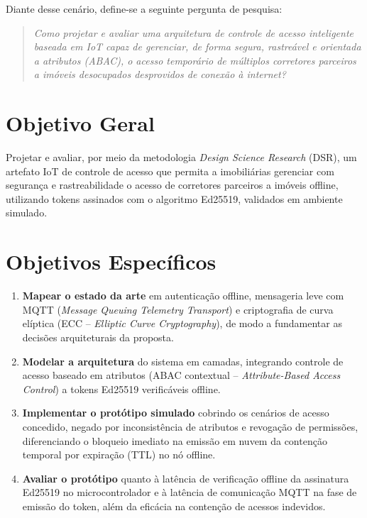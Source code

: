 Diante desse cenário, define-se a seguinte pergunta de pesquisa:

\begin{quote}
\textit{Como projetar e avaliar uma arquitetura de controle de acesso inteligente baseada em IoT capaz de gerenciar, de forma segura, rastreável e orientada a atributos (ABAC), o acesso temporário de múltiplos corretores parceiros a imóveis desocupados desprovidos de conexão à internet?}
\end{quote}

\section{Objetivo Geral}
\label{sec:objetivo-geral}

Projetar e avaliar, por meio da metodologia \textit{Design Science Research} (DSR), um artefato IoT de controle de acesso que permita a imobiliárias gerenciar com segurança e rastreabilidade o acesso de corretores parceiros a imóveis offline, utilizando tokens assinados com o algoritmo Ed25519, validados em ambiente simulado.

\section{Objetivos Específicos}
\label{sec:objetivos-especificos}

\begin{enumerate}
    \item \textbf{Mapear o estado da arte} em autenticação offline, mensageria leve com MQTT (\textit{Message Queuing Telemetry Transport}) e criptografia de curva elíptica (ECC -- \textit{Elliptic Curve Cryptography}), de modo a fundamentar as decisões arquiteturais da proposta.
    \item \textbf{Modelar a arquitetura} do sistema em camadas, integrando controle de acesso baseado em atributos (ABAC contextual -- \textit{Attribute-Based Access Control}) a tokens Ed25519 verificáveis offline.
    \item \textbf{Implementar o protótipo simulado} cobrindo os cenários de acesso concedido, negado por inconsistência de atributos e revogação de permissões, diferenciando o bloqueio imediato na emissão em nuvem da contenção temporal por expiração (TTL) no nó offline.
    \item \textbf{Avaliar o protótipo} quanto à latência de verificação offline da assinatura Ed25519 no microcontrolador e à latência de comunicação MQTT na fase de emissão do token, além da eficácia na contenção de acessos indevidos.
\end{enumerate}

